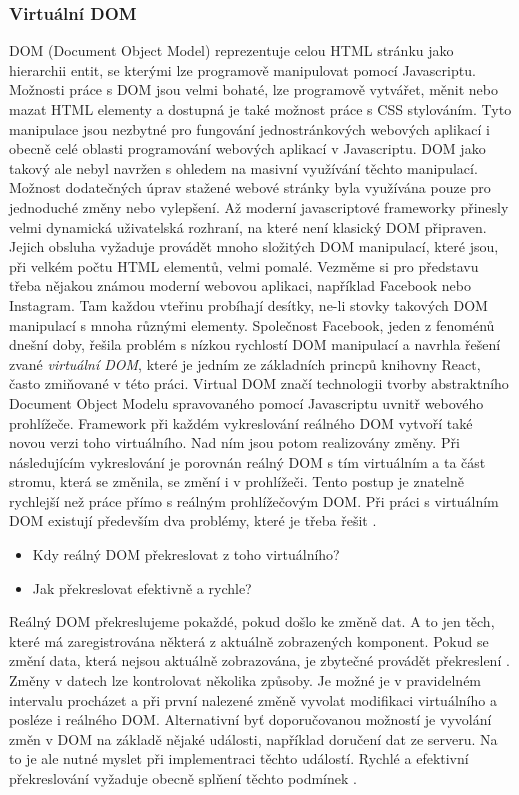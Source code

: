 \subsubsection{Virtuální DOM}
\label{sec:virtual_dom}
DOM (Document Object Model) reprezentuje celou HTML stránku jako hierarchii entit, se kterými lze programově manipulovat pomocí Javascriptu. Možnosti práce s DOM jsou velmi bohaté, lze programově vytvářet, měnit nebo mazat HTML elementy a dostupná je také možnost práce s CSS stylováním. Tyto manipulace jsou nezbytné pro fungování jednostránkových webových aplikací i obecně celé oblasti programování webových aplikací v Javascriptu. DOM jako takový ale nebyl navržen s ohledem na masivní využívání těchto manipulací. Možnost dodatečných úprav stažené webové stránky byla využívána pouze pro jednoduché změny nebo vylepšení. Až moderní javascriptové frameworky přinesly velmi dynamická uživatelská rozhraní, na které není klasický DOM připraven. Jejich obsluha vyžaduje provádět mnoho složitých DOM manipulací, které jsou, při velkém počtu HTML elementů, velmi pomalé. Vezměme si pro představu třeba nějakou známou moderní webovou aplikaci, například Facebook nebo Instagram. Tam každou vteřinu probíhají desítky, ne-li stovky takových DOM manipulací s mnoha různými elementy. Společnost Facebook, jeden z fenoménů dnešní doby, řešila problém s nízkou rychlostí DOM manipulací a navrhla řešení zvané \textit{virtuální DOM}, které je jedním ze základních princpů knihovny React, často zmiňované v této práci. Virtual DOM značí technologii tvorby abstraktního Document Object Modelu spravovaného pomocí Javascriptu uvnitř webového prohlížeče. Framework při každém vykreslování reálného DOM vytvoří také novou verzi toho virtuálního. Nad ním jsou potom realizovány změny. Při následujícím vykreslování je porovnán reálný DOM s tím virtuálním a ta část stromu, která se změnila, se změní i v prohlížeči. Tento postup je znatelně rychlejší než práce přímo s reálným prohlížečovým DOM. Při práci s virtuálním DOM existují především dva problémy, které je třeba řešit \cite{react} \cite{virtualdom}.
\begin{itemize}
\item Kdy reálný DOM překreslovat z toho virtuálního?
\item Jak překreslovat efektivně a rychle?
\end{itemize}

Reálný DOM překreslujeme pokaždé, pokud došlo ke změně dat. A to jen těch, které má zaregistrována některá z aktuálně zobrazených komponent. Pokud se změní data, která nejsou aktuálně zobrazována, je zbytečné provádět překreslení \cite{virtualdom}. Změny v datech lze kontrolovat několika způsoby. Je možné je v pravidelném intervalu procházet a při první nalezené změně vyvolat modifikaci virtuálního a posléze i reálného DOM. Alternativní byť doporučovanou možností je vyvolání změn v DOM na základě nějaké události, například doručení dat ze serveru. Na to je ale nutné myslet při implementraci těchto událostí. Rychlé a efektivní překreslování vyžaduje obecně splňení těchto podmínek \cite{react} \cite{virtualdom}.

